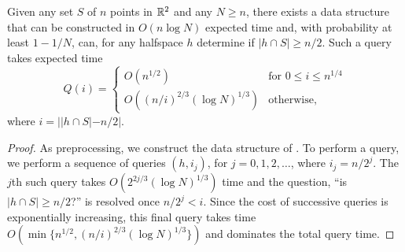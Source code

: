 \documentclass{patmorin}
\begin{document}
\begin{lem}
  Given any set $S$ of $n$ points in $\mathbb{R}^2$ and any $N\ge n$, there
  exists a data structure that can be constructed in $O(n\log N)$
  expected time and, with probability at least $1-1/N$, can, for any
  halfspace $h$ determine if $|h\cap S|\ge n/2$.  Such a query takes
  expected time 
  \[  Q(i) = \begin{cases}
        O(n^{1/2}) & \text{for $0\le i\le n^{1/4}$} \\
        O((n/i)^{2/3}(\log N)^{1/3}) & \text{otherwise, }
    \end{cases}
  \]
  where $i = ||h\cap S|-n/2|$.
\end{lem}

\begin{proof}
  As preprocessing, we construct the data structure of
  .  To perform a query, we perform a
  sequence of queries $(h,i_j)$, for $j=0,1,2,\ldots$, where $i_j=n/2^j$.
  The $j$th such query takes $O(2^{2j/3}(\log N)^{1/3})$ time and the question,
  ``is $|h\cap S|\ge n/2$?'' is resolved once $n/2^j < i$.  Since the cost
  of successive queries is exponentially increasing, this final query
  takes time $O(\min\{n^{1/2},(n/i)^{2/3}(\log N)^{1/3}\})$ and dominates the
  total query time.
\end{proof}
\end{document}
